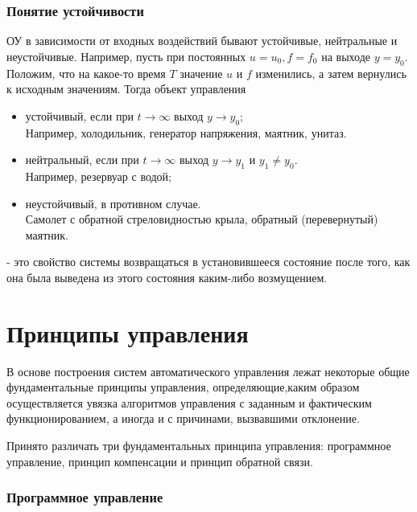 \documentclass[../../TAU.tex]{subfiles}
\begin{document}

\subsubsection{Понятие устойчивости}

    ОУ в зависимости от входных воздействий бывают устойчивые, нейтральные и неустойчивые. Например, пусть при постоянных $u = u_0, f = f_0$ на выходе $y = y_0$. Положим, что на какое-то время $T$ значение $u$ и $f$ изменились, а затем вернулись к исходным значениям. Тогда объект управления

    \begin{itemize}
        \item устойчивый, если при $t \rightarrow \infty$ выход $y \rightarrow y_0$; \\
    Например, холодильник, генератор напряжения, маятник, унитаз.
        \item нейтральный, если при $t \rightarrow \infty$ выход $y \rightarrow y_1$ и $y_1\neq y_0$. \\
    Например, резервуар с водой;
        \item неустойчивый, в противном случае.\\
    Самолет с обратной стреловидностью крыла, обратный (перевернутый) маятник.
    \end{itemize}

     - это свойство системы возвращаться в установившееся состояние после того, как она была выведена из этого состояния каким-либо возмущением.

\section{Принципы управления}
    
    В основе построения систем автоматического управления лежат некоторые общие фундаментальные принципы управления, определяющие,каким образом осуществляется увязка алгоритмов управления с заданным и фактическим функционированием, а иногда и с причинами, вызвавшими отклонение.\par
    Принято различать три фундаментальных принципа управления: программное управление, принцип компенсации и принцип обратной связи.

\subsubsection{Программное управление}
\end{document}
